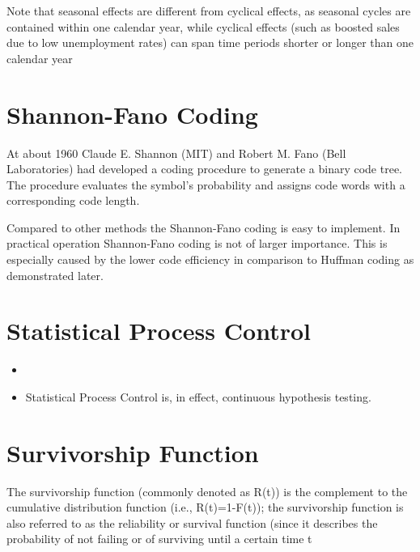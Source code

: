 Note that seasonal effects are different from cyclical effects, as seasonal cycles are contained within one calendar year, while cyclical effects (such as boosted sales due to low unemployment rates) can span time periods shorter or longer than one calendar year


\section{Shannon-Fano Coding}

At about 1960 Claude E. Shannon (MIT) and Robert M. Fano (Bell Laboratories) had developed a coding procedure to generate a binary code tree. The procedure evaluates the symbol's probability and assigns code words with a corresponding code length.

Compared to other methods the Shannon-Fano coding is easy to implement. In practical operation Shannon-Fano coding is not of larger importance. This is especially caused by the lower code efficiency in comparison to Huffman coding as demonstrated later.




\section{Statistical Process Control}


\begin{itemize}
	\item
	\item Statistical Process Control is, in effect, continuous hypothesis testing.
\end{itemize}
%
%






\section{Survivorship Function}
The survivorship function (commonly denoted as R(t)) is the complement to the cumulative distribution function
(i.e., R(t)=1-F(t)); the survivorship function is also referred to as the reliability or survival function (since it describes the probability of not 
failing or of surviving until a certain time t

